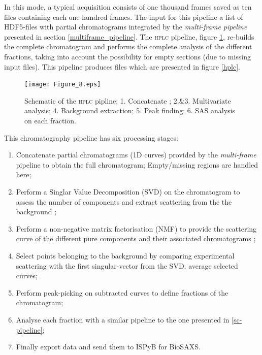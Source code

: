 \documentclass[preprint]{iucr}              %
\begin{document}
In this mode, a typical acquisition consists of one thousand frames saved as ten files containing each one hundred frames.
The input for this pipeline a list of HDF5-files with partial chromatograms integrated by the \textit{multi-frame pipeline} presented in section \ref{multiframe_pipeline}. 
The \textsc{hplc} pipeline, figure \ref{hplc_worflow}, re-builds the complete chromatogram and performs the complete analysis of the different fractions, taking into account the possibility for empty sections (due to missing input files).
This pipeline produces files which are presented in figure \ref{hplc}.
\begin{figure}
    \label{hplc_worflow}
    \texttt{[image: Figure\_8.eps]}
    \caption{Schematic of the \textsc{hplc} pipline: 
    1. Concatenate ;
    2.\&3. Multivariate analysis;
    4. Background extraction;
    5. Peak finding;
    6. SAS analysis on each fraction.}
\end{figure}

This chromatography pipeline has six processing stages:
\begin{enumerate}
    \item Concatenate partial chromatograms (1D curves) provided by the \textit{multi-frame} pipeline to obtain the full chromatogram; Empty/missing regions are handled here;
    \item Perform a Singlar Value Decomposition (SVD) on the chromatogram to assess the number of components and extract scattering from the the background \cite{BioXTAS}; 
    \item Perform a non-negative matrix factorisation (NMF) to provide the scattering curve of the different pure components and their associated chromatograms \cite{NMF-SEC_SAXS}; 
    \item Select points belonging to the background by comparing experimental scattering with the first singular-vector from the SVD; average selected curves; %
    \item Perform peak-picking on subtracted curves to define fractions of the chromatogram; 
    \item Analyse each fraction with a similar pipeline to the one presented in \ref{sc-pipeline}; %
    \item Finally export data and send them to ISPyB for BioSAXS.
\end{enumerate}
\end{document}
